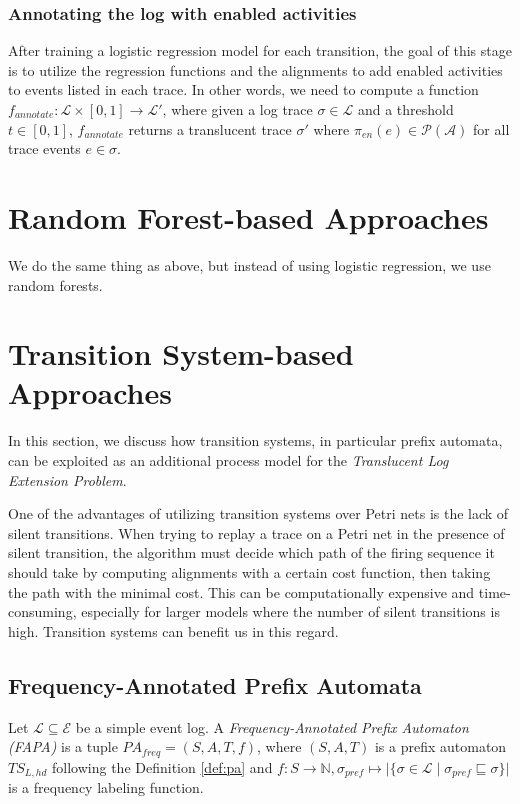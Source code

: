 \subsubsection*{Annotating the log with enabled activities}

After training a logistic regression model for each transition, the goal of this stage is to utilize the regression functions and the alignments to add enabled activities to events listed in each trace. In other words, we need to compute a function $f_{annotate} \colon \mathcal{L} \times [0, 1] \rightarrow \mathcal{L'}$, where given a log trace $\sigma \in \mathcal{L}$ and a threshold $t \in [0, 1]$, $f_{annotate}$ returns a translucent trace $\sigma'$ where $\pi_{en}(e) \in \mathcal{P(\mathcal{A})}$ for all trace events $e \in \sigma$.

\section{Random Forest-based Approaches}

We do the same thing as above, but instead of using logistic regression, we use random forests.

\section{Transition System-based Approaches}

In this section, we discuss how transition systems, in particular prefix automata, can be exploited as an additional process model for the \emph{Translucent Log Extension Problem}.

One of the advantages of utilizing transition systems over Petri nets is the lack of silent transitions. When trying to replay a trace on a Petri net in the presence of silent transition, the algorithm must decide which path of the firing sequence it should take by computing alignments with a certain cost function, then taking the path with the minimal cost. This can be computationally expensive and time-consuming, especially for larger models where the number of silent transitions is high. Transition systems can benefit us in this regard.

\subsection{Frequency-Annotated Prefix Automata}

\begin{definition}
    Let $\mathcal{L} \subseteq \mathcal{E}$ be a simple event log. A \emph{Frequency-Annotated Prefix Automaton (FAPA)} is a tuple $\mathit{PA}_{freq} = (S, A, T, f)$, where $(S, A, T)$ is a prefix automaton $\mathit{TS}_{L, hd}$ following the Definition \ref{def:pa} and  $f \colon S \to \mathbb{N}, \sigma_{pref} \mapsto \lvert \{ \sigma \in \mathcal{L} \mid \sigma_{pref} \sqsubseteq \sigma \}\rvert$ is a frequency labeling function.
\end{definition}

